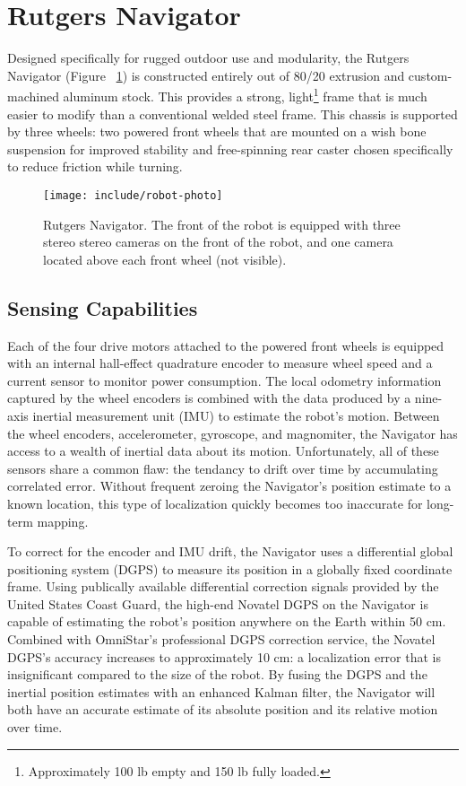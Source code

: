 \documentclass[twocolumn,11pt]{article}
\begin{document}
\section{Rutgers Navigator}
\label{sec:robot}
Designed specifically for rugged outdoor use and modularity, the Rutgers
Navigator (Figure ~\ref{fig:robot-photo}) is constructed entirely out of 80/20
extrusion and custom-machined aluminum stock. This provides a strong,
light\footnote{Approximately 100 lb empty and 150 lb fully loaded.} frame that
is much easier to modify than a conventional welded steel frame. This chassis
is supported by three wheels: two powered front wheels that are mounted on a
wish bone suspension for improved stability and free-spinning rear caster
chosen specifically to reduce friction while turning.

\begin{figure}
	\center
	\texttt{[image: include/robot-photo]}
	\caption{
		Rutgers Navigator. The front of the robot is equipped with three stereo
		stereo cameras on the front of the robot, and one camera located above
		each front wheel (not visible).
	}
	\label{fig:robot-photo}
\end{figure}

\subsection{Sensing Capabilities}
\label{sec:robot-sensors}
Each of the four drive motors attached to the powered front wheels is equipped
with an internal hall-effect quadrature encoder to measure wheel speed and a
current sensor to monitor power consumption. The local odometry information
captured by the wheel encoders is combined with the data produced by a
nine-axis inertial measurement unit (IMU) to estimate the robot's motion.
Between the wheel encoders, accelerometer, gyroscope, and magnomiter, the
Navigator has access to a wealth of inertial data about its motion.
Unfortunately, all of these sensors share a common flaw: the tendancy to drift
over time by accumulating correlated error. Without frequent zeroing the
Navigator's position estimate to a known location, this type of localization
quickly becomes too inaccurate for long-term mapping.

To correct for the encoder and IMU drift, the Navigator uses a differential
global positioning system (DGPS) to measure its position in a globally fixed
coordinate frame. Using publically available differential correction signals
provided by the United States Coast Guard, the high-end Novatel DGPS on the
Navigator is capable of estimating the robot's position anywhere on the Earth
within 50 cm.  Combined with OmniStar's professional DGPS correction service,
the Novatel DGPS's accuracy increases to approximately 10 cm: a localization
error that is insignificant compared to the size of the robot. By fusing the
DGPS and the inertial position estimates with an enhanced Kalman filter, the
Navigator will both have an accurate estimate of its absolute position and its
relative motion over time.
\end{document}
